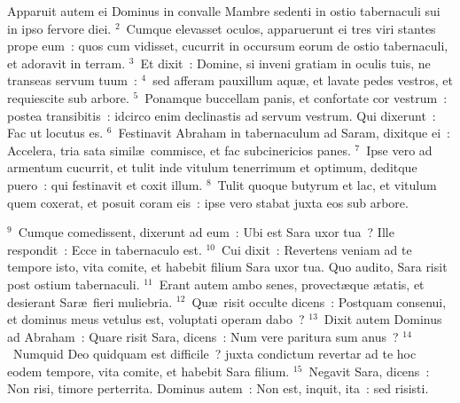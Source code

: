 \lettrine[lines=3,image=true,loversize=0.05,lraise=-0.03]{A}{}pparuit autem ei Dominus in convalle Mambre sedenti in ostio tabernaculi sui in ipso fervore diei.
${}^{2}$~Cumque elevasset oculos, apparuerunt ei tres viri stantes prope eum~: quos cum vidisset, cucurrit in occursum eorum de ostio tabernaculi, et adoravit in terram.
${}^{3}$~Et dixit~: Domine, si inveni gratiam in oculis tuis, ne transeas servum tuum~:
${}^{4}$~sed afferam pauxillum aqu\ae , et lavate pedes vestros, et requiescite sub arbore.
${}^{5}$~Ponamque buccellam panis, et confortate cor vestrum~: postea transibitis~: idcirco enim declinastis ad servum vestrum. Qui dixerunt~: Fac ut locutus es.
${}^{6}$~Festinavit Abraham in tabernaculum ad Saram, dixitque ei~: Accelera, tria sata simil\ae\ commisce, et fac subcinericios panes.
${}^{7}$~Ipse vero ad armentum cucurrit, et tulit inde vitulum tenerrimum et optimum, deditque puero~: qui festinavit et coxit illum.
${}^{8}$~Tulit quoque butyrum et lac, et vitulum quem coxerat, et posuit coram eis~: ipse vero stabat juxta eos sub arbore.


${}^{9}$~Cumque comedissent, dixerunt ad eum~: Ubi est Sara uxor tua~? Ille respondit~: Ecce in tabernaculo est.
${}^{10}$~Cui dixit~: Revertens veniam ad te tempore isto, vita comite, et habebit filium Sara uxor tua. Quo audito, Sara risit post ostium tabernaculi.
${}^{11}$~Erant autem ambo senes, provect\ae que \ae tatis, et desierant Sar\ae\ fieri muliebria.
${}^{12}$~Qu\ae\ risit occulte dicens~: Postquam consenui, et dominus meus vetulus est, voluptati operam dabo~?
${}^{13}$~Dixit autem Dominus ad Abraham~: Quare risit Sara, dicens~: Num vere paritura sum anus~?
${}^{14}$~Numquid Deo quidquam est difficile~? juxta condictum revertar ad te hoc eodem tempore, vita comite, et habebit Sara filium.
${}^{15}$~Negavit Sara, dicens~: Non risi, timore perterrita. Dominus autem~: Non est, inquit, ita~: sed risisti.


